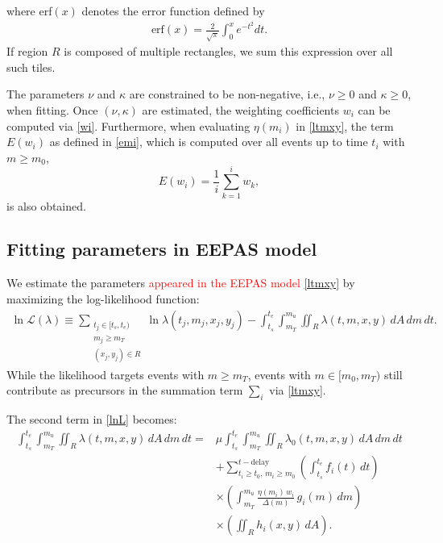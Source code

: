 \documentclass[extra,mreferee]{gji}
\theoremstyle{lemma}
\begin{document}
where erf$(x)$ denotes the error function defined by
\begin{align*}
\mathrm{erf}(x) = \frac{2}{\sqrt{\pi}} \int_0^x e^{-t^2} dt.
\end{align*}
If region $R$ is composed of multiple rectangles, we sum this expression over all such tiles. 

The parameters $\nu$ and $\kappa$ are constrained to be non-negative, i.e., $\nu \ge 0$ and $\kappa \ge 0$, when fitting. Once $(\nu, \kappa)$ are estimated, the weighting coefficients $w_i$ can be computed via \eqref{wi}. Furthermore, when evaluating $\eta(m_i)$ in \eqref{ltmxy}, the term  $E(w_i)$ as defined in \eqref{emi}, which is computed over all events up to time $t_i$ with $m \ge m_0$,
\begin{equation*}
E(w_i) = \frac{1}{i} \sum_{k = 1}^{i} w_k,
\end{equation*}
is also obtained.


\subsection{Fitting parameters in EEPAS model}
We estimate the parameters \textcolor{red}{appeared in the EEPAS model \eqref{ltmxy}} by maximizing the log-likelihood function:
\begin{equation}\label{lnL}
\begin{aligned}
\ln{\mathcal{L}(\lambda)} \equiv \sum_{\substack{t_j \in [t_s, t_e)\\ m_j \ge m_T\\ (x_j, y_j) \in R}} \ln{\lambda(t_j, m_j, x_j, y_j)} 
- \int_{t_s}^{t_e} \int_{m_T}^{m_u} \iint_{R} \lambda(t, m, x, y)\, dA\, dm\, dt.
\end{aligned}
\end{equation}
While the likelihood targets events with $m \ge m_T$, events with $m \in [m_0, m_T)$ still contribute as precursors in the summation term $\sum_i$ via \eqref{ltmxy}.

The second term in \eqref{lnL} becomes:
\begin{equation*}
\begin{aligned}
\int_{t_s}^{t_e} \int_{m_T}^{m_u} \iint_{R} \lambda(t, m, x, y)\, dA\, dm\, dt 
={}& \mu \int_{t_s}^{t_e} \int_{m_T}^{m_u} \iint_{R} \lambda_0(t, m, x, y)\, dA\, dm\, dt \\
& + \sum_{t_i \ge t_0,\, m_i \ge m_0}^{t - \text{delay}} 
\left( \int_{t_s}^{t_e} f_i(t)\, dt \right) \\
& \times \left( \int_{m_T}^{m_u} \frac{\eta(m_i)\, w_i}{\Delta(m)}\, g_i(m)\, dm \right) \\
& \times \left( \iint_{R} h_i(x, y)\, dA \right).
\end{aligned}
\end{equation*}
\end{document}

